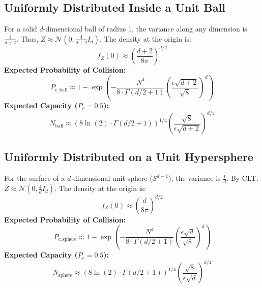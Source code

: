 \documentclass[12pt]{article}
\begin{document}
\subsection{Uniformly Distributed Inside a Unit Ball}
For a solid $d$-dimensional ball of radius 1, the variance along any dimension is $\frac{1}{d+2}$. Thus, $Z \approx \mathcal{N}(0, \frac{4}{d+2} I_d)$.
The density at the origin is:
\begin{equation}
    f_Z(0) \approx \left( \frac{d+2}{8\pi} \right)^{d/2}
\end{equation}
\textbf{Expected Probability of Collision:}
\begin{equation}
    P_{c, \text{ball}} \approx 1 - \exp\left( - \frac{N^4}{8 \cdot \Gamma(d/2 + 1)} \left( \frac{\epsilon \sqrt{d+2}}{\sqrt{8}} \right)^d \right)
\end{equation}
\textbf{Expected Capacity ($P_c = 0.5$):}
\begin{equation}
    N_{\text{ball}} \approx \left( 8 \ln(2) \cdot \Gamma(d/2 + 1) \right)^{1/4} \left( \frac{\sqrt{8}}{\epsilon \sqrt{d+2}} \right)^{d/4}
\end{equation}

\subsection{Uniformly Distributed on a Unit Hypersphere}
For the surface of a $d$-dimensional unit sphere ($S^{d-1}$), the variance is $\frac{1}{d}$. By CLT, $Z \approx \mathcal{N}(0, \frac{4}{d} I_d)$.
The density at the origin is:
\begin{equation}
    f_Z(0) \approx \left( \frac{d}{8\pi} \right)^{d/2}
\end{equation}
\textbf{Expected Probability of Collision:}
\begin{equation}
    P_{c, \text{sphere}} \approx 1 - \exp\left( - \frac{N^4}{8 \cdot \Gamma(d/2 + 1)} \left( \frac{\epsilon \sqrt{d}}{\sqrt{8}} \right)^d \right)
\end{equation}
\textbf{Expected Capacity ($P_c = 0.5$):}
\begin{equation}
    N_{\text{sphere}} \approx \left( 8 \ln(2) \cdot \Gamma(d/2 + 1) \right)^{1/4} \left( \frac{\sqrt{8}}{\epsilon \sqrt{d}} \right)^{d/4}
\end{equation}
\end{document}
